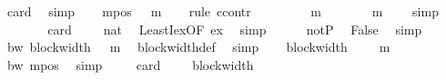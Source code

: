 \begin{isabellebody}
\ card{}\ \isamarkupfalse%
\ simp\isanewline
\ \ \isamarkupfalse%
\ m{\isacharunderscore}{\kern0pt}pos{\isacharcolon}{\kern0pt}\ {\isachardoublequoteopen}{}\ {\isacharless}{\kern0pt}\ {\isacharquery}{\kern0pt}m{\isachardoublequoteclose}\isanewline
\ \ \isamarkupfalse%
\ {\isacharparenleft}{\kern0pt}rule\ ccontr{\isacharparenright}{\kern0pt}\isanewline
\ \ \ \ \isamarkupfalse%
\ {\isachardoublequoteopen}{\isasymnot}\ {}\ {\isacharless}{\kern0pt}\ {\isacharquery}{\kern0pt}m{\isachardoublequoteclose}\isanewline
\ \ \ \ \isamarkupfalse%
\ \isamarkupfalse%
\ {\isachardoublequoteopen}{\isacharquery}{\kern0pt}m\ {\isacharequal}{\kern0pt}\ {}{\isachardoublequoteclose}\ \isamarkupfalse%
\ simp\isanewline
\ \ \ \ \isamarkupfalse%
\ \isamarkupfalse%
\ {\isachardoublequoteopen}card\ {\isasymGamma}\ {\isasymle}\ {}\ {\isacharcircum}{\kern0pt}\ {\isacharparenleft}{\kern0pt}{}{\isacharcolon}{\kern0pt}{\isacharcolon}{\kern0pt}nat{\isacharparenright}{\kern0pt}{\isachardoublequoteclose}\ \isamarkupfalse%
\ LeastI{\isacharunderscore}{\kern0pt}ex{\isacharbrackleft}{\kern0pt}OF\ ex{\isacharbrackright}{\kern0pt}\ \isamarkupfalse%
\ simp\isanewline
\ \ \ \ \isamarkupfalse%
\ notP{}\ \isamarkupfalse%
\ False\ \isamarkupfalse%
\ simp\isanewline
\ \ \isamarkupfalse%
\isanewline
\ \ \isamarkupfalse%
\ bw{\isacharcolon}{\kern0pt}\ {\isachardoublequoteopen}block{\isacharunderscore}{\kern0pt}width\ {\isasymGamma}\ {\isacharequal}{\kern0pt}\ {\isacharquery}{\kern0pt}m{\isachardoublequoteclose}\ \isamarkupfalse%
\ block{\isacharunderscore}{\kern0pt}width{\isacharunderscore}{\kern0pt}def\ \isamarkupfalse%
\ simp\isanewline
\ \ \isamarkupfalse%
\ {\isachardoublequoteopen}block{\isacharunderscore}{\kern0pt}width\ {\isasymGamma}\ {\isacharminus}{\kern0pt}\ {}\ {\isacharless}{\kern0pt}\ {\isacharquery}{\kern0pt}m{\isachardoublequoteclose}\ \isamarkupfalse%
\ bw\ m{\isacharunderscore}{\kern0pt}pos\ \isamarkupfalse%
\ simp\isanewline
\ \ \isamarkupfalse%
\ {\isachardoublequoteopen}{\isasymnot}\ card\ {\isasymGamma}\ {\isasymle}\ {}\ {\isacharcircum}{\kern0pt}\ {\isacharparenleft}{\kern0pt}block{\isacharunderscore}{\kern0pt}width\ {\isasymGamma}\ {\isacharminus}{\kern0pt}\ {}{\isacharparenright}{\kern0pt}{\isachardoublequoteclose}\ \isamarkupfalse%

\end{isabellebody}
